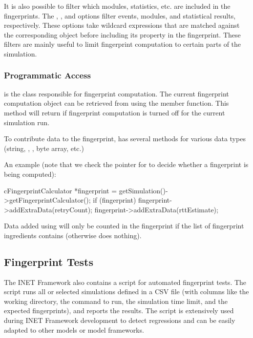 It is also possible to filter which modules, statistics, etc. are included
in the fingerprints. The ,
, and  options
filter events, modules, and statistical results, respectively. These
options take wildcard expressions that are matched against the
corresponding object before including its property in the fingerprint.
These filters are mainly useful to limit fingerprint computation to certain
parts of the simulation.

\subsubsection{Programmatic Access}
\label{sec:testing:fingerprint-programmatic-access}

 is the class responsible for fingerprint computation.
The current fingerprint computation object can be retrieved from
 using the  member function.
This method will return  if fingerprint computation is turned
off for the current simulation run.

To contribute data to the fingerprint,  has several
 methods for various data types (string, ,
, byte array, etc.)

An example (note that we check the pointer for  to decide
whether a fingerprint is being computed):

\begin{cpp}
cFingerprintCalculator *fingerprint = getSimulation()->getFingerprintCalculator();
if (fingerprint) {
    fingerprint->addExtraData(retryCount);
    fingerprint->addExtraData(rttEstimate);
}
\end{cpp}

Data added using  will only be counted in the
fingerprint if the list of fingerprint ingredients contains 
(otherwise  does nothing).

\subsection{Fingerprint Tests}
\label{sec:testing:creating-fingerprint-tests}

The INET Framework also contains a script for automated fingerprint tests.
The script runs all or selected simulations defined in a CSV file
(with columns like the working directory, the command to run, the
simulation time limit, and the expected fingerprints), and reports the
results. The script is extensively used during INET Framework development
to detect regressions and can be easily adapted to other models or model
frameworks.

